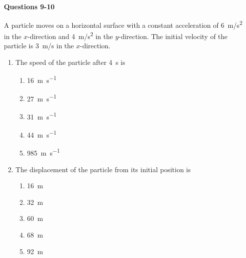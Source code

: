 \documentclass{../../oss-apphys}
\begin{document}
\begin{multicols}{2}
  \textbf{Questions 9-10}

  A particle moves on a horizontal surface with a constant acceleration of
  \SI{6}{m/s^2} in the $x$-direction and \SI{4}{m/s^2} in the $y$-direction. The
  initial velocity of the particle is \SI{3}{m/s} in the $x$-direction.
  
  \begin{enumerate}[resume,leftmargin=18pt]
  \item The speed of the particle after \SI{4}{\second} is
    \begin{enumerate}[noitemsep,topsep=0pt,leftmargin=18pt,label=(\Alph*)]
    \item\SI{16 }{\metre\per\second}
    \item\SI{27 }{\metre\per\second}
    \item\SI{31 }{\metre\per\second}
    \item\SI{44 }{\metre\per\second}
    \item\SI{985}{\metre\per\second}
    \end{enumerate}
    
  \item The displacement of the particle from its initial position is
    \begin{enumerate}[noitemsep,topsep=0pt,leftmargin=18pt,label=(\Alph*)]
    \item\SI{16}{\metre}
    \item\SI{32}{\metre}
    \item\SI{60}{\metre}
    \item\SI{68}{\metre}
    \item\SI{92}{\metre}
    \end{enumerate}

%
    \columnbreak
    

\end{enumerate}
\end{multicols}
\end{document}
